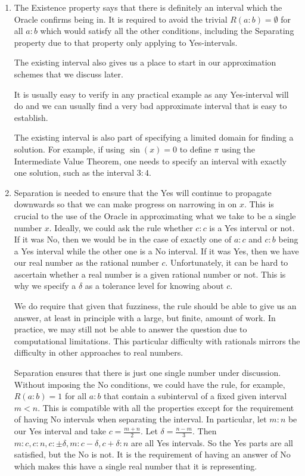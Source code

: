 \documentclass[12pt]{article}
\begin{document}
\begin{enumerate}
  
    \item The Existence property says that there is definitely an interval which the Oracle confirms being in. It is required to avoid the trivial $R(a:b) = \emptyset$ for all $a:b$ which would satisfy all the other conditions, including the Separating property due to that property only applying to Yes-intervals. 
    
    The existing interval also gives us a place to start in our approximation schemes that we discuss later. 
    
    It is usually easy to verify in any practical example as any Yes-interval will do and we can usually find a very bad approximate interval that is easy to establish. 

    The existing interval is also part of specifying a limited domain for finding a solution. For example, if using $\sin(x) = 0$ to define $\pi$ using the Intermediate Value Theorem, one needs to specify an interval with exactly one solution, such as the interval $3:4$.

    \item Separation is needed to ensure that the Yes will continue to propagate downwards so that we can make progress on narrowing in on $x$. This is crucial to the use of the Oracle in approximating what we take to be a single number $x$. Ideally, we could ask the rule whether $c:c$ is a Yes interval or not. If it was No, then we would be in the case of exactly one of $a:c$ and $c:b$ being a Yes interval while the other one is a No interval. If it was Yes, then we have our real number as the rational number $c$. Unfortunately, it can be hard to ascertain whether a real number is a given rational number or not. This is why we specify a $\delta$ as a tolerance level for knowing about $c$. 

    We do require that given that fuzziness, the rule should be able to give us an answer, at least in principle with a large, but finite, amount of work. In practice, we may still not be able to answer the question due to computational limitations. This particular difficulty with rationals mirrors the difficulty in other approaches to real numbers. 
    
    Separation ensures that there is just one single number under discussion. Without imposing the No conditions, we could have the rule, for example, $R(a:b) = 1$ for all $a:b$ that contain a subinterval of a fixed given interval $m \lt n$. This is compatible with all the properties except for the requirement of having No intervals when separating the interval. In particular, let $m:n$ be our Yes interval and take $c = \frac{m+n}{2}$. Let $\delta = \frac{n-m}{3}$. Then $m:c, c:n, c:\pm \delta, m:c-\delta, c+\delta:n$ are all Yes intervals. So the Yes parts are all satisfied, but the No is not. It is the requirement of having an answer of No which makes this have a single real number that it is representing.


\end{enumerate}
\end{document}
